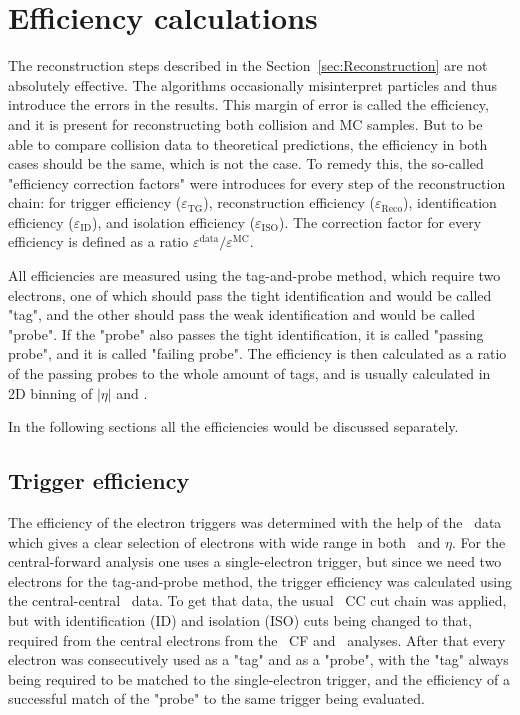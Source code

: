 \chapter{Efficiency calculations}
\label{sec:Efficiency}

The reconstruction steps described in the Section~\ref{sec:Reconstruction} are not absolutely effective. The algorithms occasionally misinterpret particles and thus introduce the errors in the results. This margin of error is called the efficiency, and it is present for reconstructing both collision and MC samples. But to be able to compare collision data to theoretical predictions, the efficiency in both cases should be the same, which is not the case. To remedy this, the so-called "efficiency correction factors" were introduces for every step of the reconstruction chain: for trigger efficiency ($\varepsilon_\mathrm{TG}$), reconstruction efficiency ($\varepsilon_\mathrm{Reco}$), identification efficiency ($\varepsilon_\mathrm{ID}$), and isolation efficiency ($\varepsilon_\mathrm{ISO}$). The correction factor for every efficiency is defined as a ratio $\varepsilon^\mathrm{data}/\varepsilon^\mathrm{MC}$.

All efficiencies are measured using the tag-and-probe method, which require two electrons, one of which should pass the tight identification and would be called "tag", and the other should pass the weak identification and would be called "probe". If the "probe" also passes the tight identification, it is called "passing probe", and it is called "failing probe". The efficiency is then calculated as a ratio of the passing probes to the whole amount of tags, and is usually calculated in 2D binning of $|\eta|$ and \pt.

In the following sections all the efficiencies would be discussed separately.

\section{Trigger efficiency}

The efficiency of the electron triggers was determined with the help of the \Zee\ data which gives a clear selection of electrons with wide range in both \pt\ and $\eta$. For the central-forward analysis one uses a single-electron trigger, but since we need two electrons for the tag-and-probe method, the trigger efficiency was calculated using the central-central \Zee\ data. To get that data, the usual \Zee\ CC cut chain was applied, but with identification (ID) and isolation (ISO) cuts being changed to that, required from the central electrons from the \Zee\ CF and \Wenu\ analyses. After that every electron was consecutively used as a "tag" and as a "probe", with the "tag" always being required to be matched to the single-electron trigger, and the efficiency of a successful match of the "probe" to the same trigger being evaluated.

